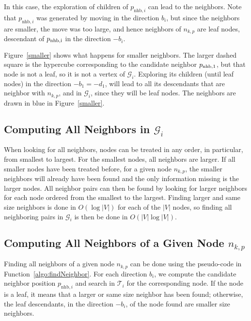 \documentclass[letterpaper, 10 pt, conference]{ieeeconf}
\theoremstyle{definition}
\begin{document}
In this case, the exploration of children of $p_{\mathrm{nhb},i}$ can lead to the neighbors. Note that $p_{\mathrm{nhb},i}$ was generated by moving in the direction $b_i$, but since the neighbors are smaller, the move was too large, and hence neighbors of $n_{k,p}$ are leaf nodes, descendant of $p_{\rm{nhb},i}$ in the direction $-b_i$.

Figure~\ref{smaller} shows what happens for smaller neighbors. The larger dashed square is the hypercube corresponding to the candidate neighbor $p_{\rm{nhb},1}$, but that node is not a leaf, so it is not a vertex of $\mathcal{G}_i$. Exploring its children (until leaf nodes) in the direction $-b_1=-d_1$, will lead to all its descendants that are neighbor with $n_{k,p}$, and in $\mathcal{G}_i$, since they will be leaf nodes. The neighbors are drawn in blue in Figure~\ref{smaller}.

\subsection{Computing All Neighbors in \texorpdfstring{$\mathcal{G}_i$}{Gi}} \label{sec:allneigh}

When looking for all neighbors, nodes can be treated in any order, in particular, from smallest to largest. For the smallest nodes, all neighbors are larger. If all smaller nodes have been treated before, for a given node $n_{k,p}$, the smaller neighbors will already have been found and the only information missing is the larger nodes.
All neighbor pairs can then be found by looking for larger neighbors for each node ordered from the smallest to the largest.
Finding larger and same size neighbors is done in  $O(\log \vert V \vert)$ for each of the $\vert V \vert$ nodes, so finding all neighboring pairs in $\mathcal{G}_i$ is then be done in $O(\vert V \vert \log \vert V \vert)$.

\subsection{Computing All Neighbors of a Given Node \texorpdfstring{$n_{k,p}$}{nkp}}

Finding all neighbors of a given node $n_{k,p}$ can be done using the pseudo-code in Function~\ref{algo:findNeighbor}.
For each direction $b_i$, we compute the candidate neighbor position $p_{\mathrm{nhb},i}$ and search in $\mathcal{T}_i$ for the corresponding node.
If the node is a leaf, it means that a larger or same size neighbor has been found;
otherwise, the leaf descendants, in the direction $-b_i$, of the node found are smaller size neighbors.
\end{document}
